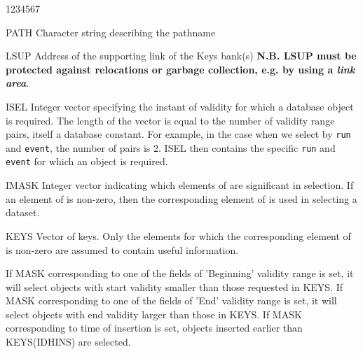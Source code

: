 \begin{DLtt}{1234567}
\item[PATH]Character string describing the pathname
\item[LSUP]Address of the supporting link of the
  Keys bank(s) 
  {\bf N.B. LSUP must be protected against relocations or garbage
collection, e.g. by using a {\it link area}}.
\item[ISEL]Integer vector specifying the instant of validity
for which a database object is required. The length of the vector
is equal to the number of validity range pairs, itself a database constant.
For example, in the case when we select by {\tt run} and {\tt event},
the number of pairs is 2. ISEL then contains the specific {\tt run}
and {\tt event} for which an object is required.
\item[IMASK]Integer vector indicating which elements of
   are significant in selection.
  If an element of  is non-zero, then the corresponding
  element of  is used in selecting a dataset.
\item[KEYS]Vector of keys. Only the elements for which the
  corresponding element of  is non-zero are
  assumed to contain useful information.

If MASK corresponding to     
one of the fields of 'Beginning' validity range is set, 
it will select objects with start validity smaller than 
those requested in KEYS. If MASK corresponding to one   
of the fields of 'End' validity range is set, it will   
select objects with end validity larger than those in   
KEYS. If MASK corresponding to time of insertion is set,
objects inserted earlier than KEYS(IDHINS) are selected. 


\end{DLtt}
